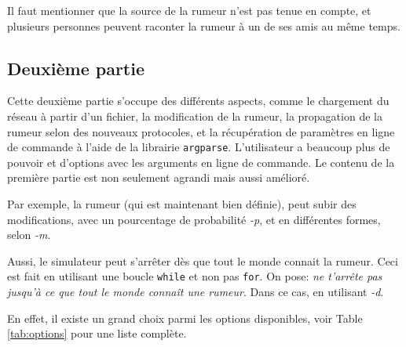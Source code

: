 \documentclass[11pt,a4paper]{article}
\begin{document}
Il faut mentionner que la source de la rumeur n'est pas tenue en compte, et
plusieurs personnes peuvent raconter la rumeur à un de ses amis au même temps.


\subsection{Deuxième partie}

Cette deuxième partie s'occupe des différents aspects, comme le chargement du
réseau à partir d'un fichier, la modification de la rumeur, la propagation de la
rumeur selon des nouveaux protocoles, et la récupération de paramètres en ligne
de commande à l'aide de la librairie \texttt{argparse}. L'utilisateur a beaucoup
plus de pouvoir et d'options avec les arguments en ligne de commande. Le contenu
de la première partie est non seulement agrandi mais aussi amélioré.

Par exemple, la rumeur (qui est maintenant bien définie), peut subir des
modifications, avec un pourcentage de probabilité \emph{-p}, et en différentes formes, selon \emph{-m}.

Aussi, le simulateur peut s'arrêter dès que tout le monde connait la
rumeur. Ceci est fait en utilisant une boucle \texttt{while} et non pas
\texttt{for}. On pose: \emph{ne t'arrête pas jusqu'à ce que tout le monde connaît une rumeur}. Dans ce cas, en utilisant \emph{-d}.


En effet, il existe un grand choix parmi les options disponibles, voir Table
\ref{tab:options} pour une liste complète.
\end{document}
